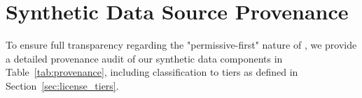 \section{Synthetic Data Source Provenance}
\label{app:synth_prov}

To ensure full transparency regarding the "permissive-first" nature of \MixtureVitae{}, we provide a detailed provenance audit of our synthetic data components in Table~\ref{tab:provenance}, including classification to tiers as defined in Section~\ref{sec:license_tiers}.

\begin{table}[htbp]
\vspace{-0.5cm}
\caption{Detailed provenance of synthetic data sources in \MixtureVitae{}.}

\centering
\scriptsize
\setlength{\tabcolsep}{3pt}      %
\setlength{\extrarowheight}{0pt}
\renewcommand{\arraystretch}{0.99} %
\vspace{-0.2cm}


\end{table}
